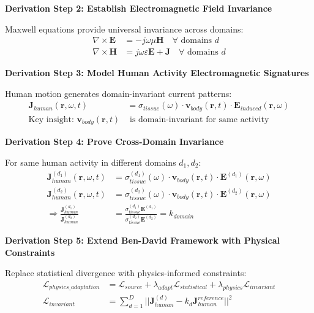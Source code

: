 \documentclass[12pt,a4paper]{article}
\begin{document}
\textbf{Derivation Step 2: Establish Electromagnetic Field Invariance}

Maxwell equations provide universal invariance across domains:
\begin{align}
\nabla \times \mathbf{E} &= -j\omega\mu\mathbf{H} \quad \forall \text{ domains } d \label{eq:maxwell_universal}\\
\nabla \times \mathbf{H} &= j\omega\varepsilon\mathbf{E} + \mathbf{J} \quad \forall \text{ domains } d \label{eq:maxwell_universal_ampere}
\end{align}

\textbf{Derivation Step 3: Model Human Activity Electromagnetic Signatures}

Human motion generates domain-invariant current patterns:
\begin{align}
\mathbf{J}_{human}(\mathbf{r},\omega,t) &= \sigma_{tissue}(\omega) \cdot \mathbf{v}_{body}(\mathbf{r},t) \cdot \mathbf{E}_{induced}(\mathbf{r},\omega) \label{eq:human_current_original}\\
\text{Key insight: } \mathbf{v}_{body}(\mathbf{r},t) &\text{ is domain-invariant for same activity} \label{eq:velocity_invariance}
\end{align}

\textbf{Derivation Step 4: Prove Cross-Domain Invariance}

For same human activity in different domains $d_1, d_2$:
\begin{align}
\mathbf{J}_{human}^{(d_1)}(\mathbf{r},\omega,t) &= \sigma_{tissue}^{(d_1)}(\omega) \cdot \mathbf{v}_{body}(\mathbf{r},t) \cdot \mathbf{E}^{(d_1)}(\mathbf{r},\omega) \label{eq:current_d1}\\
\mathbf{J}_{human}^{(d_2)}(\mathbf{r},\omega,t) &= \sigma_{tissue}^{(d_2)}(\omega) \cdot \mathbf{v}_{body}(\mathbf{r},t) \cdot \mathbf{E}^{(d_2)}(\mathbf{r},\omega) \label{eq:current_d2}\\
\Rightarrow \frac{\mathbf{J}_{human}^{(d_1)}}{\mathbf{J}_{human}^{(d_2)}} &= \frac{\sigma_{tissue}^{(d_1)} \mathbf{E}^{(d_1)}}{\sigma_{tissue}^{(d_2)} \mathbf{E}^{(d_2)}} = k_{domain} \label{eq:current_scaling_invariance}
\end{align}

\textbf{Derivation Step 5: Extend Ben-David Framework with Physical Constraints}

Replace statistical divergence with physics-informed constraints:
\begin{align}
\mathcal{L}_{physics\_adaptation} &= \mathcal{L}_{source} + \lambda_{adapt} \mathcal{L}_{statistical} + \lambda_{physics} \mathcal{L}_{invariant} \label{eq:physics_da_loss}\\
\mathcal{L}_{invariant} &= \sum_{d=1}^D ||\mathbf{J}_{human}^{(d)} - k_d \mathbf{J}_{human}^{reference}||^2 \label{eq:physics_invariant_loss_detail}
\end{align}
\end{document}
